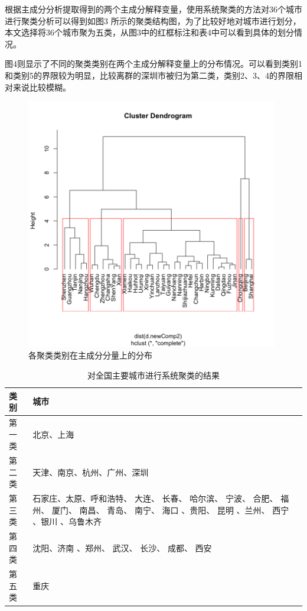 \documentclass [a4paper]{article}
\begin{document}
根据主成分分析提取得到的两个主成分解释变量，使用系统聚类的方法对36个城市进行聚类分析可以得到如图3 所示的聚类结构图，为了比较好地对城市进行划分，本文选择将36个城市聚为五类，从图3中的红框标注和表4中可以看到具体的划分情况。

图4则显示了不同的聚类类别在两个主成分解释变量上的分布情况。可以看到类别1和类别5的界限较为明显，比较离群的深圳市被归为第二类，类别2、3、4的界限相对来说比较模糊。

\begin{figure}[h!]
  \centering
         \includegraphics[width=11cm]{img/cluster.png}
      \caption{各聚类类别在主成分分量上的分布}
\end{figure}

\begin{table}[h]
\caption{对全国主要城市进行系统聚类的结果}
\small %
\centering
\begin{tabular}{p{2cm}p{10cm}}
\toprule
类别 & 城市 \\
\midrule
第一类 & 北京、上海 \\ \midrule
第二类 & 天津、南京、杭州、广州、深圳\\ \midrule
第三类 & 石家庄、太原、呼和浩特、 大连、 长春、 哈尔滨、 宁波、 合肥、 福州、 厦门、 南昌、 青岛、 南宁、 海口 、贵阳、 昆明 、兰州、 西宁 、银川 、乌鲁木齐\\ \midrule
第四类 & 沈阳、济南 、郑州、 武汉、 长沙、 成都、 西安\\ \midrule
第五类 & 重庆\\
\bottomrule
\end{tabular}
\end{table}
\end{document}
